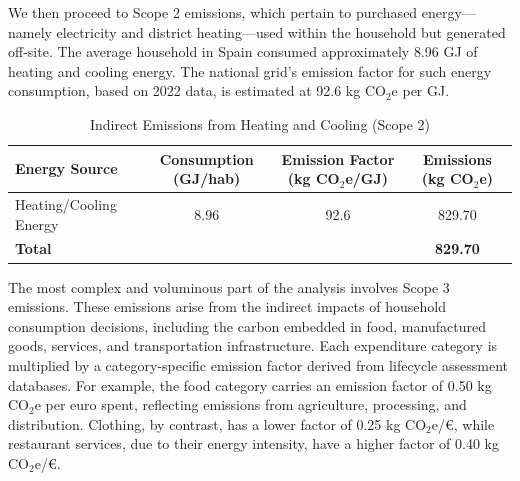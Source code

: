 \documentclass[12pt,a4paper]{article}%
\begin{document}
We then proceed to Scope 2 emissions, which pertain to purchased energy—namely electricity and district heating—used within the household but generated off-site. The average household in Spain consumed approximately 8.96 GJ of heating and cooling energy. The national grid's emission factor for such energy consumption, based on 2022 data, is estimated at 92.6 kg CO$_2$e per GJ.

\begin{table}[h]
\centering
\caption{Indirect Emissions from Heating and Cooling (Scope 2)}\label{tab:scope2}
\begin{tabular}{|l|c|c|c|}
\hline
\textbf{Energy Source} & \textbf{Consumption (GJ/hab)} & \textbf{Emission Factor (kg CO$_2$e/GJ)} & \textbf{Emissions (kg CO$_2$e)} \\
\hline
Heating/Cooling Energy & 8.96 & 92.6 & 829.70 \\
\hline
\textbf{Total} & & & \textbf{829.70} \\
\hline
\end{tabular}
\end{table}

The most complex and voluminous part of the analysis involves Scope 3 emissions. These emissions arise from the indirect impacts of household consumption decisions, including the carbon embedded in food, manufactured goods, services, and transportation infrastructure. Each expenditure category is multiplied by a category-specific emission factor derived from lifecycle assessment databases. For example, the food category carries an emission factor of 0.50 kg CO$_2$e per euro spent, reflecting emissions from agriculture, processing, and distribution. Clothing, by contrast, has a lower factor of 0.25 kg CO$_2$e/€, while restaurant services, due to their energy intensity, have a higher factor of 0.40 kg CO$_2$e/€.
\end{document}
